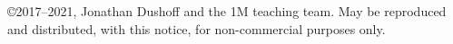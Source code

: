 \copyright 2017--2021, Jonathan Dushoff and the 1M teaching team.  May be reproduced and distributed, with this notice, for non-commercial purposes only.
